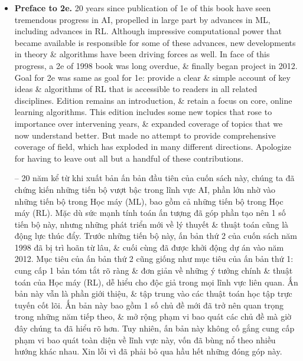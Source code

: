 \documentclass{article}
\begin{document}
\begin{itemize}
    \item {\bf Preface to 2e.} 20 years since publication of 1e of this book have seen tremendous progress in AI, propelled in large part by advances in ML, including advances in RL. Although impressive computational power that became available is responsible for some of these advances, new developments in theory \& algorithms have been driving forces as well. In face of this progress, a 2e of 1998 book was long overdue, \& finally began project in 2012. Goal for 2e was same as goal for 1e: provide a clear \& simple account of key ideas \& algorithms of RL that is accessible to readers in all related disciplines. Edition remains an introduction, \& retain a focus on core, online learning algorithms. This edition includes some new topics that rose to importance over intervening years, \& expanded coverage of topics that we now understand better. But made no attempt to provide comprehensive coverage of field, which has exploded in many different directions. Apologize for having to leave out all but a handful of these contributions.

    -- 20 năm kể từ khi xuất bản ấn bản đầu tiên của cuốn sách này, chúng ta đã chứng kiến những tiến bộ vượt bậc trong lĩnh vực AI, phần lớn nhờ vào những tiến bộ trong Học máy (ML), bao gồm cả những tiến bộ trong Học máy (RL). Mặc dù sức mạnh tính toán ấn tượng đã góp phần tạo nên 1 số tiến bộ này, nhưng những phát triển mới về lý thuyết \& thuật toán cũng là động lực thúc đẩy. Trước những tiến bộ này, ấn bản thứ 2 của cuốn sách năm 1998 đã bị trì hoãn từ lâu, \& cuối cùng đã được khởi động dự án vào năm 2012. Mục tiêu của ấn bản thứ 2 cũng giống như mục tiêu của ấn bản thứ 1: cung cấp 1 bản tóm tắt rõ ràng \& đơn giản về những ý tưởng chính \& thuật toán của Học máy (RL), dễ hiểu cho độc giả trong mọi lĩnh vực liên quan. Ấn bản này vẫn là phần giới thiệu, \& tập trung vào các thuật toán học tập trực tuyến cốt lõi. Ấn bản này bao gồm 1 số chủ đề mới đã trở nên quan trọng trong những năm tiếp theo, \& mở rộng phạm vi bao quát các chủ đề mà giờ đây chúng ta đã hiểu rõ hơn. Tuy nhiên, ấn bản này không cố gắng cung cấp phạm vi bao quát toàn diện về lĩnh vực này, vốn đã bùng nổ theo nhiều hướng khác nhau. Xin lỗi vì đã phải bỏ qua hầu hết những đóng góp này.


\end{itemize}
\end{document}
